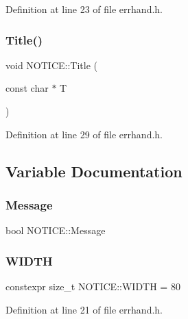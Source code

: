 Definition at line 23 of file errhand.\+h.

\mbox{\label{namespace_n_o_t_i_c_e_a0ddfb0ca7dfa968616d34f4752368bba}} 
\subsubsection{\texorpdfstring{Title()}{Title()}}
{\footnotesize\ttfamily void N\+O\+T\+I\+C\+E\+::\+Title (\begin{DoxyParamCaption}\item[{const char $\ast$}]{T }\end{DoxyParamCaption})\hspace{0.3cm}{\ttfamily [inline]}}



Definition at line 29 of file errhand.\+h.



\subsection{Variable Documentation}
\mbox{\label{namespace_n_o_t_i_c_e_a4de9d52506c4de1641e95f4f53669e3f}} 
\subsubsection{\texorpdfstring{Message}{Message}}
{\footnotesize\ttfamily bool N\+O\+T\+I\+C\+E\+::\+Message}

\mbox{\label{namespace_n_o_t_i_c_e_a31f6fb221f22faf96b9cfb05315d1d3e}} 
\subsubsection{\texorpdfstring{W\+I\+D\+TH}{WIDTH}}
{\footnotesize\ttfamily constexpr size\+\_\+t N\+O\+T\+I\+C\+E\+::\+W\+I\+D\+TH = 80}



Definition at line 21 of file errhand.\+h.

